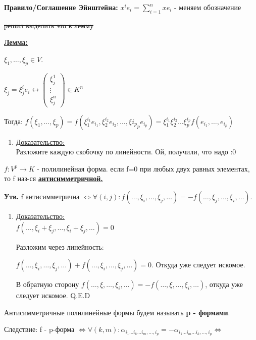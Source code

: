 \documentclass[twoside]{book}
\newcommand{\prooff}[1]{{\underline{Доказательство:}} \\ }
\begin{document}

\textbf{Правило/Соглашение Эйнштейна:} \(x^i e_i = \sum\limits_{i=1}^n x e_i\) - меняем обозначение


\sout{решил выделить это в лемму} %

\uline{\textbf{Лемма:}}

$\xi_1,\ldots, \xi_p \in V$.

\(\xi_j  = \xi_j^ie_i \leftrightarrow \begin{pmatrix}
    \xi_j^1 \\
    \vdots  \\
    \xi_j^n
\end{pmatrix} \in K^n \)

Тогда: \(f(\xi_1,\ldots,\xi_p) = f(\xi_1^{i_1}e_{i_1}, \xi_2^{i_2}e_{i_2},\ldots, \xi{i_p}_p e_{i_p}) =  \xi_1^{i_1} \xi_2^{i_2}\ldots \xi_p^{i_p} f(e_{i_1},
\ldots,e_{i_p})\)

\begin{enumerate}
    \item[] \prooff{}
          Разложите каждую скобочку по линейности. Ой, получили, что надо :0
\end{enumerate}



\(f: V^p \rightarrow K\) - полилинейная форма. если f=0 при любых двух равных элементах, то f наз-ся \uline{\textbf{антисимметричной.}}

\textbf{Утв.} f антисимметрична \(\Leftrightarrow \forall(i,j): f(\ldots,\xi_i,\ldots, \xi_j,\ldots) =- f(\ldots,\xi_j,\ldots, \xi_i,\ldots) \).

\begin{enumerate}
    \item[] \prooff{}

          \(f(\ldots, \xi_i + \xi_j,\ldots, \xi_i + \xi_j,\ldots) = 0\)

          Разложим через линейность:

          \(f(\ldots, \xi_i,\ldots,  \xi_j,\ldots)  + f(\ldots, \xi_i,\ldots,  \xi_j,\ldots)  = 0\). Откуда уже следует искомое.

          В обратную сторону  \(f(\ldots, \xi ,\ldots, \xi_i,\ldots) = - f(\ldots, \xi ,\ldots, \xi_i,\ldots)\), откуда уже следует искомое.  Q.E.D
\end{enumerate}

Антисимметричные полилинейные формы будем называть \textbf{p - формами}.

Следствие: f - p-форма \(\Leftrightarrow \forall  (k,m): \alpha_{i_1 \ldots i_k \ldots i_m, \ldots, i_p} = - \alpha_{i_1 \ldots i_m \ldots i_k, \ldots, i_p} \Leftrightarrow\)
\end{document}
